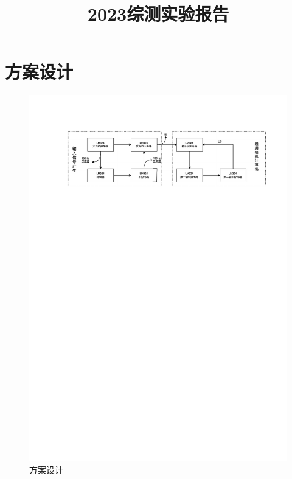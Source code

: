 \documentclass[12pt]{ctexart}
\title{2023综测实验报告}
\begin{document}
\maketitle
\section{方案设计}
\begin{figure}[H]
	\centering
	\includegraphics[width=1\textwidth]{方案设计框图}
	\caption{方案设计}
\end{figure}
	
\end{document}
